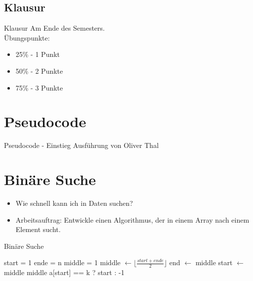 \documentclass[18pt]{beamer}
\begin{document}
\subsection{Klausur}
\begin{frame}{Klausur}
 Am Ende des Semesters. \\
 Übungspunkte:
 \begin{itemize}
  \item 25\% - 1 Punkt
  \item 50\% - 2 Punkte
  \item 75\% - 3 Punkte
 \end{itemize}

\end{frame}


\section{Pseudocode}
\begin{frame}{Pseudocode - Einstieg}
 Ausführung von Oliver Thal
\end{frame}

\section{Binäre Suche}
\begin{frame}
 \begin{itemize}
  \item Wie schnell kann ich in Daten suchen?
  \item Arbeitsauftrag: Entwickle einen Algorithmus, der in einem Array nach einem Element sucht.
 \end{itemize}

\end{frame}

\begin{frame}[fragile]{Binäre Suche}
 \begin{algorithmic}
    \State start = 1
    \State ende = n
    \State middle = 1
      \State middle $\gets\lfloor \frac{start + ende}{2} \rfloor$
	\State end $\gets$ middle
        \State start $\gets$ middle
      \Else
        \State \Return middle
      \EndIf
    \EndWhile
    \State \Return a[start] == k ? start : -1
  \EndFunction
 \end{algorithmic}
\end{frame}
\end{document}
